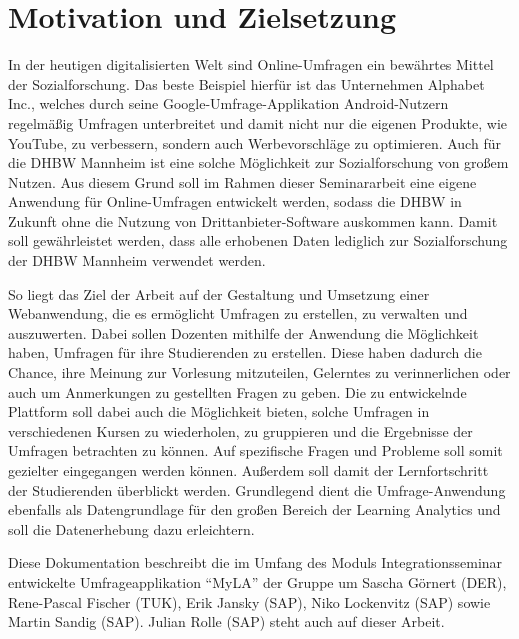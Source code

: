 \section{Motivation und Zielsetzung}

In der heutigen digitalisierten Welt sind Online-Umfragen ein bewährtes Mittel der Sozialforschung.
Das beste Beispiel hierfür ist das Unternehmen Alphabet Inc., welches durch seine Google-Umfrage-Applikation Android-Nutzern regelmäßig Umfragen unterbreitet und damit nicht nur die eigenen Produkte, wie YouTube, zu verbessern, sondern auch Werbevorschläge zu optimieren.
Auch für die \acs{DHBW} Mannheim ist eine solche Möglichkeit zur Sozialforschung von großem Nutzen.
Aus diesem Grund soll im Rahmen dieser Seminararbeit eine eigene Anwendung für Online-Umfragen entwickelt werden, sodass die \acs{DHBW} in Zukunft ohne die Nutzung von Drittanbieter-Software auskommen kann.
Damit soll gewährleistet werden, dass alle erhobenen Daten lediglich zur Sozialforschung der \acs{DHBW} Mannheim verwendet werden.

So liegt das Ziel der Arbeit auf der Gestaltung und Umsetzung einer Webanwendung, die es ermöglicht Umfragen zu erstellen, zu verwalten und auszuwerten.
Dabei sollen Dozenten mithilfe der Anwendung die Möglichkeit haben, Umfragen für ihre Studierenden zu erstellen.
Diese haben dadurch die Chance, ihre Meinung zur Vorlesung mitzuteilen, Gelerntes zu verinnerlichen oder auch um Anmerkungen zu gestellten Fragen zu geben.
Die zu entwickelnde Plattform soll dabei auch die Möglichkeit bieten, solche Umfragen in verschiedenen Kursen zu wiederholen, zu gruppieren und die Ergebnisse der Umfragen betrachten zu können.
Auf spezifische Fragen und Probleme soll somit gezielter eingegangen werden können.
Außerdem soll damit der Lernfortschritt der Studierenden überblickt werden.
Grundlegend dient die Umfrage-Anwendung ebenfalls als Datengrundlage für den großen Bereich der Learning Analytics und soll die Datenerhebung dazu erleichtern.


Diese Dokumentation beschreibt die im Umfang des Moduls Integrationsseminar entwickelte Umfrageapplikation \enquote{MyLA} der Gruppe um Sascha Görnert (DER), Rene-Pascal Fischer (TUK), Erik Jansky (SAP), Niko Lockenvitz (SAP) sowie Martin Sandig (SAP).
Julian Rolle (SAP) steht auch auf dieser Arbeit.

